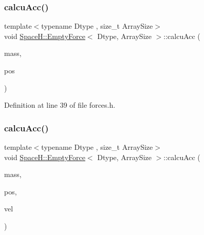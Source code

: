 \subsubsection{\texorpdfstring{calcu\+Acc()}{calcuAcc()}\hspace{0.1cm}{\footnotesize\ttfamily [1/4]}}
{\footnotesize\ttfamily template$<$typename Dtype , size\+\_\+t Array\+Size$>$ \\
void \mbox{\hyperlink{struct_space_h_1_1_empty_force}{Space\+H\+::\+Empty\+Force}}$<$ Dtype, Array\+Size $>$\+::calcu\+Acc (\begin{DoxyParamCaption}\item[{const \mbox{\hyperlink{struct_space_h_1_1_empty_force_afdeb66410650cdb1e2e3b1e1fd79540c}{Scalar\+Array}} \&}]{mass,  }\item[{const \mbox{\hyperlink{struct_space_h_1_1_empty_force_a06ad868879a6fa5def9c7f9fd75fffde}{Vector\+Array}} \&}]{pos }\end{DoxyParamCaption})\hspace{0.3cm}{\ttfamily [inline]}}



Definition at line 39 of file forces.\+h.

\mbox{\label{struct_space_h_1_1_empty_force_af5373ca3798b19d9b4eb155c3fe7cf46}} 
\subsubsection{\texorpdfstring{calcu\+Acc()}{calcuAcc()}\hspace{0.1cm}{\footnotesize\ttfamily [2/4]}}
{\footnotesize\ttfamily template$<$typename Dtype , size\+\_\+t Array\+Size$>$ \\
void \mbox{\hyperlink{struct_space_h_1_1_empty_force}{Space\+H\+::\+Empty\+Force}}$<$ Dtype, Array\+Size $>$\+::calcu\+Acc (\begin{DoxyParamCaption}\item[{const \mbox{\hyperlink{struct_space_h_1_1_empty_force_afdeb66410650cdb1e2e3b1e1fd79540c}{Scalar\+Array}} \&}]{mass,  }\item[{const \mbox{\hyperlink{struct_space_h_1_1_empty_force_a06ad868879a6fa5def9c7f9fd75fffde}{Vector\+Array}} \&}]{pos,  }\item[{const \mbox{\hyperlink{struct_space_h_1_1_empty_force_a06ad868879a6fa5def9c7f9fd75fffde}{Vector\+Array}} \&}]{vel }\end{DoxyParamCaption})\hspace{0.3cm}{\ttfamily [inline]}}



